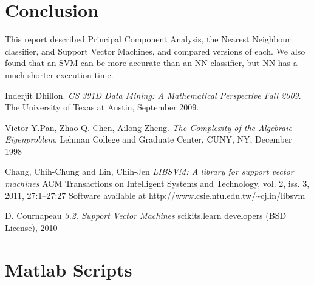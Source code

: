 \documentclass[10pt,twocolumn,letterpaper]{article}
\begin{document}
\section{Conclusion}
This report described Principal Component Analysis, the Nearest Neighbour classifier, and Support Vector Machines, and compared versions of each. We also found that an SVM can be more accurate than an NN classifier, but NN has a much shorter execution time.
{\small


}

\begin{thebibliography}{9}
Inderjit Dhillon. 
\textit{CS 391D Data Mining: A Mathematical Perspective Fall 2009}. 
The University of Texas at Austin, September 2009.

Victor Y.Pan, Zhao Q. Chen, Ailong Zheng. 
\textit{The Complexity of the Algebraic Eigenproblem}. 
Lehman College and Graduate Center, CUNY, NY, December 1998

Chang, Chih-Chung and Lin, Chih-Jen
\textit{LIBSVM: A library for support vector machines}
ACM Transactions on Intelligent Systems and Technology, vol. 2, iss. 3, 2011, 27:1--27:27
Software available at \url{http://www.csie.ntu.edu.tw/~cjlin/libsvm}

D. Cournapeau
\textit{3.2. Support Vector Machines}
scikits.learn developers (BSD License), 2010

\end{thebibliography}

\section{Matlab Scripts}
\end{document}
